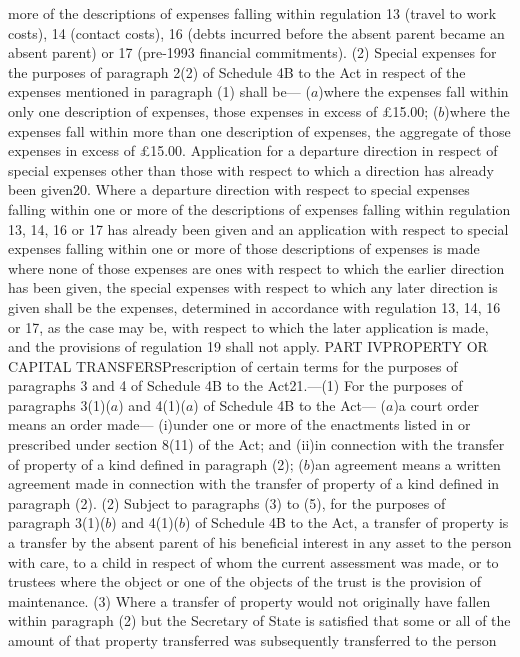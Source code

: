 \documentclass[a4paper]{article}
\begin{document}
more of the descriptions of expenses falling within regulation 13 (travel to
work costs), 14 (contact costs), 16 (debts incurred before the absent parent
became an absent parent) or 17 (pre-1993 financial commitments).
(2) Special expenses for the purposes of paragraph 2(2) of Schedule 4B to the
Act in respect of the expenses mentioned in paragraph (1) shall be—
($a$)where the expenses fall within only one description of expenses, those
expenses in excess of £15.00;
($b$)where the expenses fall within more than one description of expenses, the
aggregate of those expenses in excess of £15.00.
Application for a departure direction in respect of special expenses other than
those with respect to which a direction has already been given20. Where a
departure direction with respect to special expenses falling within one or more
of the descriptions of expenses falling within regulation 13, 14, 16 or 17 has
already been given and an application with respect to special expenses falling
within one or more of those descriptions of expenses is made where none of those
expenses are ones with respect to which the earlier direction has been given,
the special expenses with respect to which any later direction is given shall be
the expenses, determined in accordance with regulation 13, 14, 16 or 17, as the
case may be, with respect to which the later application is made, and the
provisions of regulation 19 shall not apply.
PART IVPROPERTY OR CAPITAL TRANSFERSPrescription of certain terms for the
purposes of paragraphs 3 and 4 of Schedule 4B to the Act21.—(1) For the purposes
of paragraphs 3(1)($a$) and 4(1)($a$) of Schedule 4B to the Act—
($a$)a court order means an order made—
(i)under one or more of the enactments listed in or prescribed under section
8(11) of the Act; and
(ii)in connection with the transfer of property of a kind defined in paragraph
(2);
($b$)an agreement means a written agreement made in connection with the transfer
of property of a kind defined in paragraph (2).
(2) Subject to paragraphs (3) to (5), for the purposes of paragraph 3(1)($b$) and
4(1)($b$) of Schedule 4B to the Act, a transfer of property is a transfer by the
absent parent of his beneficial interest in any asset to the person with care,
to a child in respect of whom the current assessment was made, or to trustees
where the object or one of the objects of the trust is the provision of
maintenance.
(3) Where a transfer of property would not originally have fallen within
paragraph (2) but the Secretary of State is satisfied that some or all of the
amount of that property transferred was subsequently transferred to the person
\end{document}
